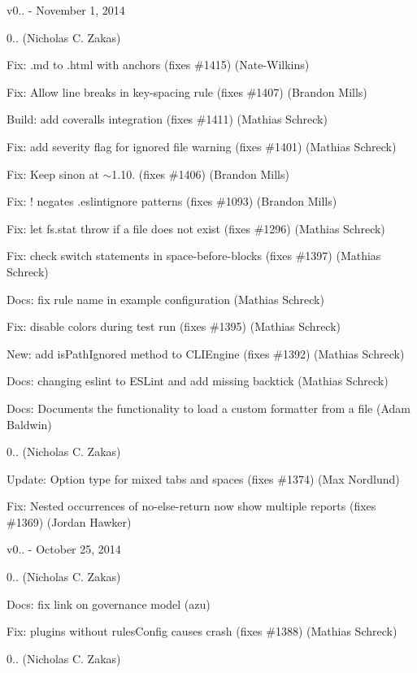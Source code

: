 v0.. -\/ November 1, 2014


\begin{DoxyItemize}
\item 0.. (Nicholas C. Zakas)
\item Fix\+: \textquotesingle{}.md\textquotesingle{} to \textquotesingle{}.html\textquotesingle{} with anchors (fixes \#1415) (Nate-\/\+Wilkins)
\item Fix\+: Allow line breaks in key-\/spacing rule (fixes \#1407) (Brandon Mills)
\item Build\+: add coveralls integration (fixes \#1411) (Mathias Schreck)
\item Fix\+: add severity flag for ignored file warning (fixes \#1401) (Mathias Schreck)
\item Fix\+: Keep sinon at $\sim$1.10. (fixes \#1406) (Brandon Mills)
\item Fix\+: ! negates .eslintignore patterns (fixes \#1093) (Brandon Mills)
\item Fix\+: let fs.\+stat throw if a file does not exist (fixes \#1296) (Mathias Schreck)
\item Fix\+: check switch statements in space-\/before-\/blocks (fixes \#1397) (Mathias Schreck)
\item Docs\+: fix rule name in example configuration (Mathias Schreck)
\item Fix\+: disable colors during test run (fixes \#1395) (Mathias Schreck)
\item New\+: add is\+Path\+Ignored method to C\+L\+I\+Engine (fixes \#1392) (Mathias Schreck)
\item Docs\+: changing eslint to E\+S\+Lint and add missing backtick (Mathias Schreck)
\item Docs\+: Documents the functionality to load a custom formatter from a file (Adam Baldwin)
\item 0.. (Nicholas C. Zakas)
\item Update\+: Option type for mixed tabs and spaces (fixes \#1374) (Max Nordlund)
\item Fix\+: Nested occurrences of no-\/else-\/return now show multiple reports (fixes \#1369) (Jordan Hawker)
\end{DoxyItemize}

v0.. -\/ October 25, 2014


\begin{DoxyItemize}
\item 0.. (Nicholas C. Zakas)
\item Docs\+: fix link on governance model (azu)
\item Fix\+: plugins without rules\+Config causes crash (fixes \#1388) (Mathias Schreck)
\item 0.. (Nicholas C. Zakas)
\end{DoxyItemize}

